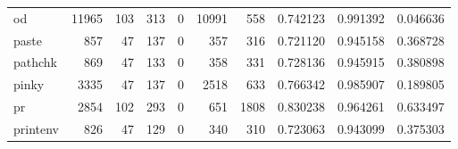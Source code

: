 \begin{tabular}{lrrrrrrrrr}
od        &                               11965 &                                             103 &                                            313 &                                             0 &                                          10991 &                                          558 &                                           0.742123 &                               0.991392 &                             0.046636 \\
paste     &                                 857 &                                              47 &                                            137 &                                             0 &                                            357 &                                          316 &                                           0.721120 &                               0.945158 &                             0.368728 \\
pathchk   &                                 869 &                                              47 &                                            133 &                                             0 &                                            358 &                                          331 &                                           0.728136 &                               0.945915 &                             0.380898 \\
pinky     &                                3335 &                                              47 &                                            137 &                                             0 &                                           2518 &                                          633 &                                           0.766342 &                               0.985907 &                             0.189805 \\
pr        &                                2854 &                                             102 &                                            293 &                                             0 &                                            651 &                                         1808 &                                           0.830238 &                               0.964261 &                             0.633497 \\
printenv  &                                 826 &                                              47 &                                            129 &                                             0 &                                            340 &                                          310 &                                           0.723063 &                               0.943099 &                             0.375303 \\

\end{tabular}
